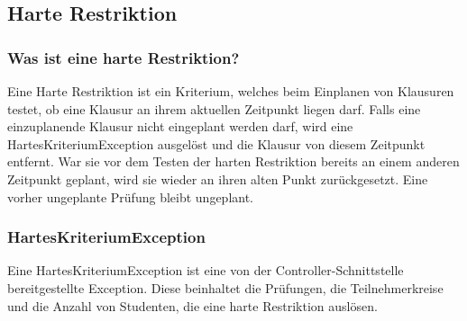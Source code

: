 \subsection{Harte Restriktion}\label{subsec:harte_restriktion}

\subsubsection{Was ist eine harte Restriktion?}
Eine Harte Restriktion ist ein Kriterium, welches beim Einplanen von Klausuren testet,
ob eine Klausur an ihrem aktuellen Zeitpunkt liegen darf.
Falls eine einzuplanende Klausur nicht eingeplant werden darf,
wird eine HartesKriteriumException ausgelöst und die Klausur von diesem Zeitpunkt entfernt.
War sie vor dem Testen der harten Restriktion bereits an einem anderen Zeitpunkt geplant,
wird sie wieder an ihren alten Punkt zurückgesetzt.
Eine vorher ungeplante Prüfung bleibt ungeplant.

\subsubsection{HartesKriteriumException}
Eine HartesKriteriumException ist eine von der Controller-Schnittstelle bereitgestellte Exception.
Diese beinhaltet die Prüfungen, die Teilnehmerkreise und die Anzahl von Studenten, die eine harte
Restriktion auslösen.


